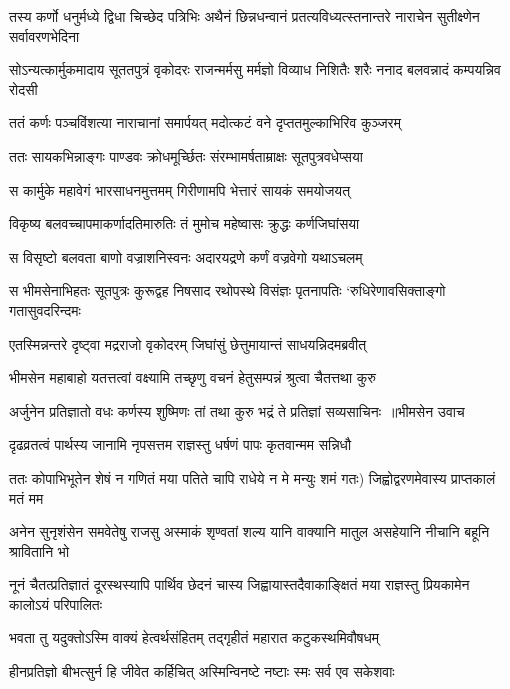 तस्य कर्णो धनुर्मध्ये द्विधा चिच्छेद पत्रिभिः
\twolineshloka
{अथैनं छिन्नधन्वानं प्रतत्यविध्यत्स्तनान्तरे}
{नाराचेन सुतीक्ष्णेन सर्वावरणभेदिना}


\threelineshloka
{सोऽन्यत्कार्मुकमादाय सूततपुत्रं वृकोदरः}
{राजन्मर्मसु मर्मज्ञो विव्याध निशितैः शरैः}
{ननाद बलवन्नादं कम्पयन्निव रोदसी}


\twolineshloka
{ततं कर्णः पञ्चविंशत्या नाराचानां समार्पयत्}
{मदोत्कटं वने दृप्ततमुल्काभिरिव कुञ्जरम्}


\twolineshloka
{ततः सायकभिन्नाङ्गः पाण्डवः क्रोधमूर्च्छितः}
{संरम्भामर्षताम्राक्षः सूतपुत्रवधेप्सया}


\twolineshloka
{स कार्मुके महावेगं भारसाधनमुत्तमम्}
{गिरीणामपि भेत्तारं सायकं समयोजयत्}


\twolineshloka
{विकृष्य बलवच्चापमाकर्णादतिमारुतिः}
{तं मुमोच महेष्वासः क्रुद्धः कर्णजिघांसया}


\twolineshloka
{स विसृष्टो बलवता बाणो वज्राशनिस्वनः}
{अदारयद्रणे कर्णं वज्रवेगो यथाऽचलम्}


\threelineshloka
{स भीमसेनाभिहतः सूतपुत्रः कुरूद्वह}
{निषसाद रथोपस्थे विसंज्ञः पृतनापतिः}
{`रुधिरेणावसिक्ताङ्गो गतासुवदरिन्दमः}


\twolineshloka
{एतस्मिन्नन्तरे दृष्ट्वा मद्रराजो वृकोदरम्}
{जिघांसुं छेत्तुमायान्तं साधयन्निदमब्रवीत्}


\twolineshloka
{भीमसेन महाबाहो यतत्तत्वां वक्ष्यामि तच्छृणु}
{वचनं हेतुसम्पन्नं श्रुत्वा चैतत्तथा कुरु}


\threelineshloka
{अर्जुनेन प्रतिज्ञातो वधः कर्णस्य शुष्मिणः}
{तां तथा कुरु भद्रं ते प्रतिज्ञां सव्यसाचिनः ॥भीमसेन उवाच}
{}


\twolineshloka
{दृढव्रतत्वं पार्थस्य जानामि नृपसत्तम}
{राज्ञस्तु धर्षणं पापः कृतवान्मम सन्निधौ}


\threelineshloka
{ततः कोपाभिभूतेन शेषं न गणितं मया}
{पतिते चापि राधेये न मे मन्युः शमं गतः)}
{जिह्वोद्वरणमेवास्य प्राप्तकालं मतं मम}


\threelineshloka
{अनेन सुनृशंसेन समवेतेषु राजसु}
{अस्माकं शृण्वतां शल्य यानि वाक्यानि मातुल}
{असहेयानि नीचानि बहूनि श्रावितानि भो}


\threelineshloka
{नूनं चैतत्प्रतिज्ञातं दूरस्थस्यापि पार्थिव}
{छेदनं चास्य जिह्वायास्तदैवाकाङ्क्षितं मया}
{राज्ञस्तु प्रियकामेन कालोऽयं परिपालितः}


\twolineshloka
{भवता तु यदुक्तोऽस्मि वाक्यं हेत्वर्थसंहितम्}
{तद्गृहीतं महारात कटुकस्थमिवौषधम्}


\twolineshloka
{हीनप्रतिज्ञो बीभत्सुर्न हि जीवेत कर्हिचित्}
{अस्मिन्विनष्टे नष्टाः स्मः सर्व एव सकेशवाः}


